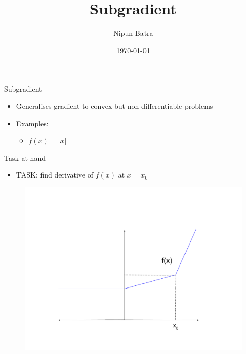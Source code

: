 \documentclass{beamer}
\title{Subgradient}
\date{\today}
\author{Nipun Batra}
\institute{IIT Gandhinagar}
\begin{document}
  \maketitle
  
  
  

\begin{frame}{Subgradient }
\begin{itemize}
	
	
	\item Generalises gradient to convex but non-differentiable problems
	\item Examples:
	\begin{itemize}
		\item $f(x) = |x|$
	\end{itemize}
	
\end{itemize}
\end{frame}

\begin{frame}{Task at hand}
\begin{itemize}

\item TASK: find derivative of $f(x)$ at $x = x_0$
\end{itemize}
\begin{figure}
    \centering
    \includegraphics[scale = 0.25]{subgradient_1.pdf}
    
    \label{fig:Non-differentiable function}
\end{figure}
	

\end{frame}
\end{document}
